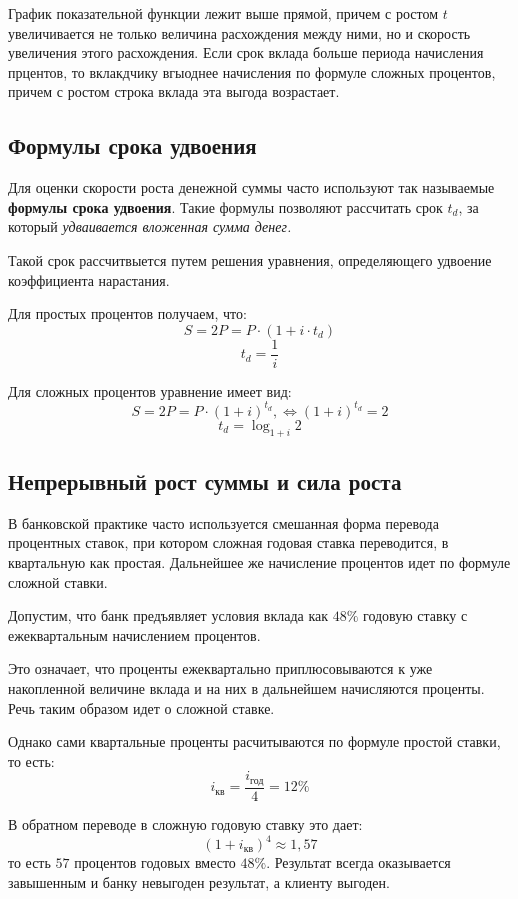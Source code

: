 \documentclass[aps,%
12pt,%
final,%
oneside,
onecolumn,%
musixtex, %
superscriptaddress,%
centertags]{article} %
\theoremstyle{plain}
\theoremstyle{definition}
\theoremstyle{remark}
\begin{document}
График показательной функции лежит выше прямой, причем с ростом $t$ увеличивается не только величина расхождения между ними, но и скорость увеличения этого расхождения. Если срок вклада больше периода начисления прцентов, то вклакдчику вгыоднее начисления по формуле сложных процентов, причем с ростом строка вклада эта выгода возрастает.


\subsection{Формулы срока удвоения}

Для оценки скорости роста денежной суммы часто используют так называемые \textbf{формулы срока удвоения}. Такие формулы позволяют рассчитать срок $t_d$, за который \textit{удваивается вложенная сумма денег.}

Такой срок рассчитвыется путем решения уравнения, определяющего удвоение коэффициента нарастания.

Для простых процентов получаем, что:
$$S = 2P = P \cdot (1 + i \cdot t_{d})$$
$$t_d = \frac{1}{i}$$

Для сложных процентов уравнение имеет вид:
$$S = 2P = P \cdot (1+i)^{t_d}, \Leftrightarrow (1+i)^{t_d} = 2$$
$$t_d = \log_{1+i} 2 $$



\subsection{Непрерывный рост суммы и сила роста}

В банковской практике часто используется смешанная форма перевода процентных ставок, при котором сложная годовая ставка переводится, в квартальную как простая. Дальнейшее же начисление процентов идет по формуле сложной ставки.

Допустим, что банк предъявляет условия вклада как $48 \%$ годовую ставку с ежеквартальным начислением процентов.

Это означает, что проценты ежеквартально приплюсовываются к уже накопленной величине вклада и на них в дальнейшем начисляются проценты. Речь таким образом идет о сложной ставке.

Однако сами квартальные проценты расчитываются по формуле простой ставки, то есть:
$$i_{\text{кв}} = \frac{i_{\text{год}}}{4} = 12\%$$

В обратном переводе в сложную годовую ставку это дает:
$$(1+i_{\text{кв}})^4 \approx 1,57$$
то есть $57$ процентов годовых вместо $48 \%$. Результат всегда оказывается завышенным и банку невыгоден результат, а клиенту выгоден.
\end{document}
